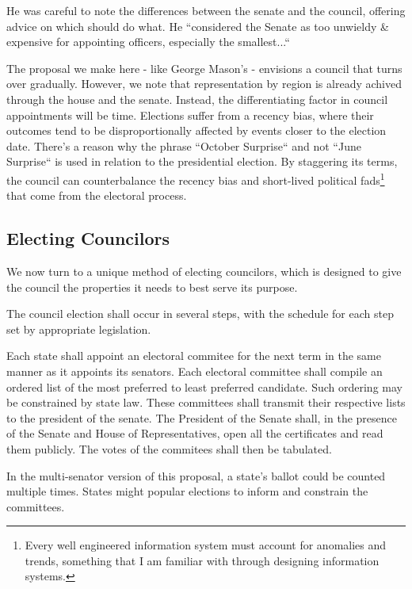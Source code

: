 \documentclass{article}
\begin{document}
He was careful to note the differences between the senate and the council, offering advice on which should do what. He “considered the Senate as too unwieldy \& expensive for appointing officers, especially the smallest...“

The proposal we make here - like George Mason's - envisions a council that turns over gradually. However, we note that representation by region is already achived through the house and the senate. Instead, the differentiating factor in council appointments will be time. Elections suffer from a recency bias, where their outcomes tend to be disproportionally affected by events closer to the election date. There's a reason why the phrase “October Surprise“ and not “June Surprise“ is used in relation to the presidential election. By staggering its terms, the council can counterbalance the recency bias and short-lived political fads\footnote{Every well engineered information system must account for anomalies and trends, something that I am familiar with through designing information systems.\cite{Yang}\cite{Sklar}\cite{Sklar_Trending}} that come from the electoral process.

\subsection{Electing Councilors}

We now turn to a unique method of electing councilors, which is designed to give the council the properties it needs to best serve its purpose.

\begin{quoting}
The council election shall occur in several steps, with the schedule for each step set by appropriate legislation.

Each state shall appoint an electoral commitee for the next term in the same manner as it appoints its senators. Each electoral committee shall compile an ordered list of the most preferred to least preferred candidate. Such ordering may be constrained by state law. These committees shall transmit their respective lists to the president of the senate.  The President of the Senate shall, in the presence of the Senate and House of Representatives, open all the certificates and read them publicly. The votes of the commitees shall then be tabulated.
\end{quoting}

In the multi-senator version of this proposal, a state's ballot could be counted multiple times. States might popular elections to inform and constrain the committees.
\end{document}
